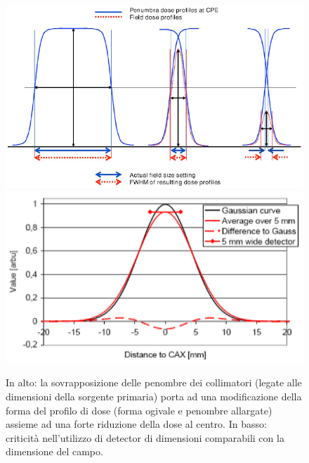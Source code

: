 \begin{figure}[!t]
\centering
\includegraphics[width=.7\textwidth]{./cap2/small_eff1.png}
\includegraphics[width=.7\textwidth]{./cap2/small_eff2.png}
\caption{In alto: la sovrapposizione delle penombre dei collimatori (legate alle dimensioni della sorgente primaria) porta ad una modificazione della forma del profilo di dose (forma ogivale e penombre allargate) assieme ad una forte riduzione della dose al centro. In basso: criticità nell'utilizzo di detector di dimensioni comparabili con la dimensione del campo.}
\label{fig:small_eff}
\end{figure}

